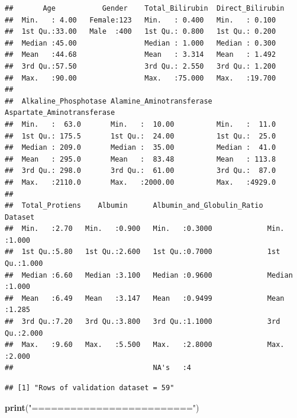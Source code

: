 \documentclass[]{article}
\newenvironment{Shaded}{\begin{snugshade}}{\end{snugshade}}
\newcommand{\KeywordTok}[1]{\textcolor[rgb]{0.13,0.29,0.53}{\textbf{#1}}}
\newcommand{\NormalTok}[1]{#1}
\newcommand{\StringTok}[1]{\textcolor[rgb]{0.31,0.60,0.02}{#1}}
\begin{document}
\begin{verbatim}
##       Age           Gender    Total_Bilirubin  Direct_Bilirubin
##  Min.   : 4.00   Female:123   Min.   : 0.400   Min.   : 0.100  
##  1st Qu.:33.00   Male  :400   1st Qu.: 0.800   1st Qu.: 0.200  
##  Median :45.00                Median : 1.000   Median : 0.300  
##  Mean   :44.68                Mean   : 3.314   Mean   : 1.492  
##  3rd Qu.:57.50                3rd Qu.: 2.550   3rd Qu.: 1.200  
##  Max.   :90.00                Max.   :75.000   Max.   :19.700  
##                                                                
##  Alkaline_Phosphotase Alamine_Aminotransferase Aspartate_Aminotransferase
##  Min.   :  63.0       Min.   :  10.00          Min.   :  11.0            
##  1st Qu.: 175.5       1st Qu.:  24.00          1st Qu.:  25.0            
##  Median : 209.0       Median :  35.00          Median :  41.0            
##  Mean   : 295.0       Mean   :  83.48          Mean   : 113.8            
##  3rd Qu.: 298.0       3rd Qu.:  61.00          3rd Qu.:  87.0            
##  Max.   :2110.0       Max.   :2000.00          Max.   :4929.0            
##                                                                          
##  Total_Protiens    Albumin      Albumin_and_Globulin_Ratio    Dataset     
##  Min.   :2.70   Min.   :0.900   Min.   :0.3000             Min.   :1.000  
##  1st Qu.:5.80   1st Qu.:2.600   1st Qu.:0.7000             1st Qu.:1.000  
##  Median :6.60   Median :3.100   Median :0.9600             Median :1.000  
##  Mean   :6.49   Mean   :3.147   Mean   :0.9499             Mean   :1.285  
##  3rd Qu.:7.20   3rd Qu.:3.800   3rd Qu.:1.1000             3rd Qu.:2.000  
##  Max.   :9.60   Max.   :5.500   Max.   :2.8000             Max.   :2.000  
##                                 NA's   :4
\end{verbatim}

\begin{Shaded}
\end{Shaded}

\begin{verbatim}
## [1] "Rows of validation dataset = 59"
\end{verbatim}

\begin{Shaded}
\begin{Highlighting}[]
\KeywordTok{print}\NormalTok{(}\StringTok{"========================="}\NormalTok{)}
\end{Highlighting}
\end{Shaded}
\end{document}
